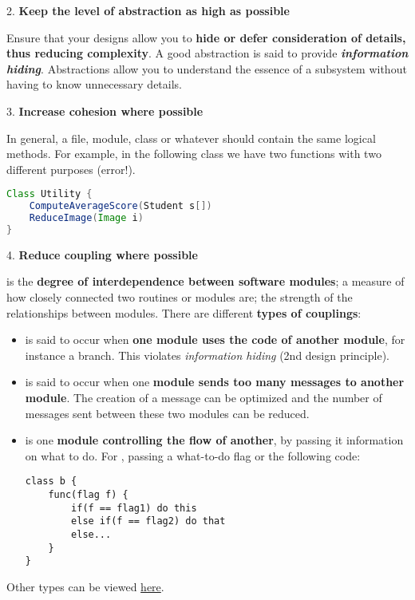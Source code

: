 \begin{flushleft}
    \large
    \textcolor{Red3}{2. \textbf{Keep the level of abstraction as high as possible}}
\end{flushleft}
Ensure that your designs allow you to \textbf{hide or defer consideration of details, thus reducing complexity}. A good abstraction is said to provide \emph{\textbf{information hiding}}. Abstractions allow you to understand the essence of a subsystem without having to know unnecessary details.

\begin{flushleft}
    \large
    \textcolor{Red3}{3. \textbf{Increase cohesion where possible}}
\end{flushleft}
In general, a file, module, class or whatever should contain the same logical methods. For example, in the following class we have two functions with two different purposes (error!).
\begin{lstlisting}[language=Java]
Class Utility {
    ComputeAverageScore(Student s[])
    ReduceImage(Image i)
}\end{lstlisting}

\newpage

\begin{flushleft}
    \large
    \textcolor{Red3}{4. \textbf{Reduce coupling where possible}}
\end{flushleft}
 is the \textbf{degree of interdependence between software modules}; a measure of how closely connected two routines or modules are; the strength of the relationships between modules. There are different \textbf{types of couplings}:
\begin{itemize}
    \item {} is said to occur when \textbf{one module uses the code of another module}, for instance a branch. This violates \emph{information hiding} (2nd design principle).
    
    \item {} is said to occur when one \textbf{module sends too many messages to another module}. The creation of a message can be optimized and the number of messages sent between these two modules can be reduced.

    \item {} is one \textbf{module controlling the flow of another}, by passing it information on what to do. For , passing a what-to-do flag or the following code:
    \begin{lstlisting}
class b {
    func(flag f) {
        if(f == flag1) do this
        else if(f == flag2) do that
        else...
    }
}\end{lstlisting}
\end{itemize}
Other types can be viewed \href{https://en.wikipedia.org/wiki/Coupling_%28computer_programming%29#Types_of_coupling}{here}.

